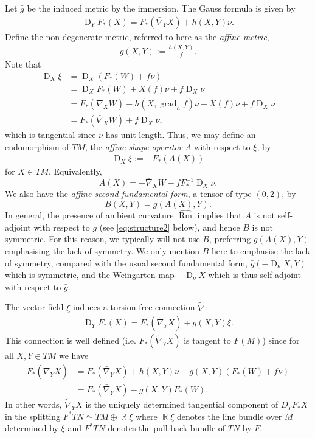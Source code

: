 \documentclass{amsart}
\theoremstyle{definition}
\theoremstyle{remark}
\DeclareMathOperator{\grad}{grad}
\DeclareMathOperator{\Rm}{Rm}
\DeclareMathOperator{\D}{D}
\DeclareMathOperator{\RR}{\mathbb{R}}
\numberwithin{equation}{section}
\begin{document}
Let $\bar{g}$ be the induced metric by the immersion. The Gauss formula is given by
\begin{align}\label{gauss equ}
\D_YF_{\ast}(X)=F_{\ast}(\bar{\nabla}_YX)+h(X,Y)\nu.
\end{align}
Define the non-degenerate metric, referred to here as the \emph{affine metric},
\begin{align}
g(X,Y):=\frac{h(X,Y)}{ f }.
\end{align}
Note that
\begin{align*}
\D_X \xi &= \D_X (F_{\ast}(W) + f \nu) \\
&= \D_X F_{\ast}(W) + X(f)\nu + f \D_X \nu \\
&= F_{\ast}(\bar{\nabla}_X W) - h(X, \grad_h f) \nu + X(f) \nu + f \D_X \nu \\
&= F_{\ast} (\bar{\nabla}_X W) + f \D_X \nu,
\end{align*}
which is tangential since $\nu$ has unit length. Thus, we may define an endomorphism of $TM$, the \emph{affine shape operator} $A$ with respect to $\xi$, by
\begin{align}
\D_X\xi := -F_{\ast}(A(X))
\end{align}
for $X\in TM$. Equivalently,
\[
A(X) =- \bar{\nabla}_X W - f F_{\ast}^{-1} \D_X \nu.
\]
We also have the \emph{affine second fundamental form}, a tensor of type $(0, 2)$, by
\[
B(X, Y) = g(A(X), Y).
\]
In general, the presence of ambient curvature $\widehat{\Rm}$ implies that $A$ is not self-adjoint with respect to $g$ (see \eqref{eq:structure2} below), and hence $B$ is not symmetric. For this reason, we typically will not use $B$, preferring $g(A(X), Y)$ emphasising the lack of symmetry. We only mention $B$ here to emphasise the lack of symmetry, compared with the usual second fundamental form, $\bar{g}(-\D_{\nu} X, Y)$ which is symmetric, and the Weingarten map $-\D_{\nu} X$ which is thus self-adjoint with respect to $\bar{g}$.

The vector field $\xi$ induces a torsion free connection $\tilde{\nabla}$:
\begin{align}\label{gauss equ2}
\D_YF_{\ast}(X)=F_{\ast}(\tilde{\nabla}_YX)+g(X,Y)\xi.
\end{align}
This connection is well defined (i.e. $F_{\ast}(\tilde{\nabla}_Y X)$ is tangent to $F(M)$) since for all $X,Y\in TM$ we have
\begin{align}
F_{\ast}(\tilde{\nabla}_Y X) &= F_{\ast}(\bar{\nabla}_Y X) + h(X, Y) \nu - g(X, Y) (F_{\ast}(W) + f \nu) \\
&= F_{\ast}(\bar{\nabla}_YX)-g(X,Y)F_{\ast}(W) \nonumber.
\end{align}
In other words, $\tilde{\nabla}_Y X$ is the uniquely determined tangential component of $D_Y F_{\ast} X$ in the splitting $F^{\ast} TN \simeq TM \oplus \RR \xi$ where $\RR\xi$ denotes the line bundle over $M$ determined by $\xi$ and $F^{\ast} TN$ denotes the pull-back bundle of $TN$ by $F$.
\end{document}
